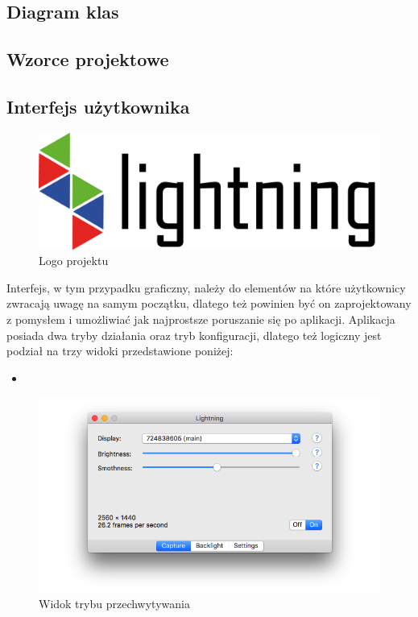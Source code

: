 \documentclass[12pt]{report}
\begin{document}
\subsection{Diagram klas}


\subsection{Wzorce projektowe}


\subsection{Interfejs użytkownika}

\begin{figure}[h]
\centering
\includegraphics[width=\textwidth]{../resources/logo.png}
\caption{Logo projektu}
\end{figure}

Interfejs, w tym przypadku graficzny, należy do elementów na które użytkownicy zwracają uwagę na samym początku, dlatego też powinien być on zaprojektowany z pomysłem i umożliwiać jak najprostsze poruszanie się po aplikacji.
Aplikacja posiada dwa tryby działania oraz tryb konfiguracji, dlatego też logiczny jest podział na trzy widoki przedstawione poniżej:


\begin{itemize}
	\item 
\end{itemize}

\begin{figure}[h]
\centering
\includegraphics[width=\textwidth]{../resources/capture.png}
\caption{Widok trybu przechwytywania}
\end{figure}
\end{document}

